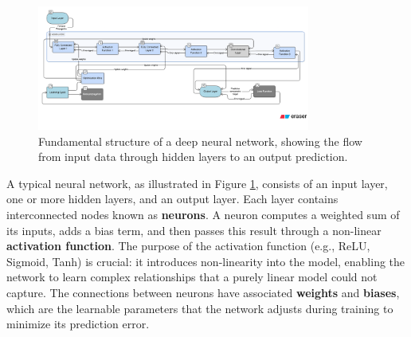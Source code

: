 \documentclass[16pt]{report}
\begin{document}
\begin{figure}[H]
    \centering
    \includegraphics[width=0.8\textwidth]{images/deep-learning-graph.png}
    \caption{Fundamental structure of a deep neural network, showing the flow from input data through hidden layers to an output prediction.}
    \label{fig:deep-learning-graph}
\end{figure}

A typical neural network, as illustrated in Figure \ref{fig:deep-learning-graph}, consists of an input layer, one or more hidden layers, and an output layer. Each layer contains interconnected nodes known as \textbf{neurons}. A neuron computes a weighted sum of its inputs, adds a bias term, and then passes this result through a non-linear \textbf{activation function}. The purpose of the activation function (e.g., ReLU, Sigmoid, Tanh) is crucial: it introduces non-linearity into the model, enabling the network to learn complex relationships that a purely linear model could not capture. The connections between neurons have associated \textbf{weights} and \textbf{biases}, which are the learnable parameters that the network adjusts during training to minimize its prediction error.
\end{document}
